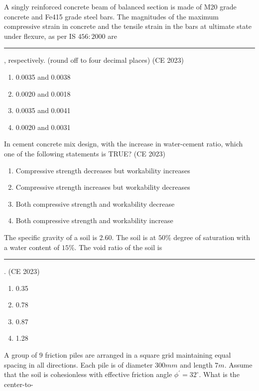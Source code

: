 \iffalse
\title{CE-2023-14-26}
\author{EE24BTECH11041-Mohit}
\section{CE}
\chapter{2023}
\fi

\item A singly reinforced concrete beam of balanced section is made of M20 grade concrete and Fe415 grade steel bars. The magnitudes of the maximum compressive strain in concrete and the tensile strain in the bars at ultimate state under flexure, as per IS $456: 2000$ are \rule{2cm}{0.4pt}, respectively. (round off to four decimal places)
\hfill{(CE 2023)}
\begin{enumerate}
\item 0.0035 and 0.0038
\item 0.0020 and 0.0018
\item 0.0035 and 0.0041
\item 0.0020 and 0.0031
\end{enumerate}
\item In cement concrete mix design, with the increase in water-cement ratio, which one of the following statements is TRUE?
\hfill{(CE 2023)}
\begin{enumerate}
\item Compressive strength decreases but workability increases
\item Compressive strength increases but workability decreases
\item Both compressive strength and workability decrease
\item Both compressive strength and workability increase
\end{enumerate}
\item The specific gravity of a soil is $2.60$. The soil is at $50 \%$ degree of saturation with a
water content of $15 \%$. The void ratio of the soil is \rule{2cm}{0.4pt}.
\hfill{(CE 2023)}
\begin{enumerate}
\item 0.35
\item 0.78
\item 0.87
\item 1.28
\end{enumerate}
\item A group of $9$ friction piles are arranged in a square grid maintaining equal spacing in all directions. Each pile is of diameter $300 mm$ and length $7 m$. Assume that the soil is cohesionless with effective friction angle $\phi^{'} = 32^{\circ}$. What is the center-to-
